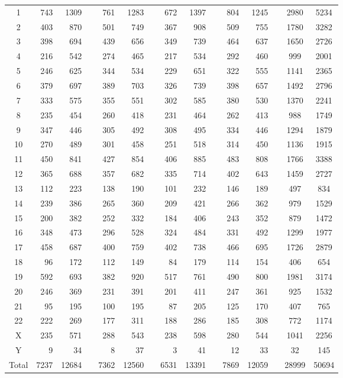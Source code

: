 \documentclass[letterpaper,12pt]{article}
\numberwithin{equation}{appendix}
\newcommand*{\boldrow}{%
  \global\let\rowfont\bfseries
  \bfseries
}
\newcommand*{\rowfont}{}
\begin{document}
\begin{landscape}
{{\begin{longtable}{c >{\rowfont}r >{\rowfont}r >{\rowfont}c >{\rowfont}r >{\rowfont}r >{\rowfont}c >{\rowfont}r >{\rowfont}r >{\rowfont}c >{\rowfont}r >{\rowfont}r >{\rowfont}c | >{\rowfont}c >{\rowfont}c}
\midrule
\endhead
\midrule
\endfoot
\label{tab:probesperchrom}
1& 743& 1309&& 761& 1283&& 672& 1397&& 804& 1245&& 2980& 5234\tabularnewline
2& 403&  870&& 501&  749&& 367&  908&& 509&  755&& 1780& 3282\tabularnewline
3& 398&  694&& 439&  656&& 349&  739&& 464&  637&& 1650& 2726\tabularnewline
4& 216&  542&& 274&  465&& 217&  534&& 292&  460&&  999& 2001\tabularnewline
5& 246&  625&& 344&  534&& 229&  651&& 322&  555&& 1141& 2365\tabularnewline
6& 379&  697&& 389&  703&& 326&  739&& 398&  657&& 1492& 2796\tabularnewline
7& 333&  575&& 355&  551&& 302&  585&& 380&  530&& 1370& 2241\tabularnewline
8& 235&  454&& 260&  418&& 231&  464&& 262&  413&&  988& 1749\tabularnewline
9& 347&  446&& 305&  492&& 308&  495&& 334&  446&& 1294& 1879\tabularnewline
10& 270&  489&& 301&  458&& 251&  518&& 314&  450&& 1136& 1915\tabularnewline
11& 450&  841&& 427&  854&& 406&  885&& 483&  808&& 1766& 3388\tabularnewline
12& 365&  688&& 357&  682&& 335&  714&& 402&  643&& 1459& 2727\tabularnewline
13& 112&  223&& 138&  190&& 101&  232&& 146&  189&&  497&  834\tabularnewline
14& 239&  386&& 265&  360&& 209&  421&& 266&  362&&  979& 1529\tabularnewline
15& 200&  382&& 252&  332&& 184&  406&& 243&  352&&  879& 1472\tabularnewline
16& 348&  473&& 296&  528&& 324&  484&& 331&  492&& 1299& 1977\tabularnewline
17& 458&  687&& 400&  759&& 402&  738&& 466&  695&& 1726& 2879\tabularnewline
18&  96&  172&& 112&  149&&  84&  179&& 114&  154&&  406&  654\tabularnewline
19& 592&  693&& 382&  920&& 517&  761&& 490&  800&& 1981& 3174\tabularnewline
20& 246&  369&& 231&  391&& 201&  411&& 247&  361&&  925& 1532\tabularnewline
21&  95&  195&& 100&  195&&  87&  205&& 125&  170&&  407&  765\tabularnewline
22& 222&  269&& 177&  311&& 188&  286&& 185&  308&&  772& 1174\tabularnewline
X& 235&  571&& 288&  543&& 238&  598&& 280&  544&& 1041& 2256\tabularnewline
Y&   9&   34&&   8&   37&&   3&   41&&  12&   33&&   32&  145\tabularnewline
\boldrow Total&7237&12684&&7362&12560&&6531&13391&&7869&12059&&28999&50694\tabularnewline
\bottomrule
\end{longtable}
}}
\end{landscape}
\end{document}

